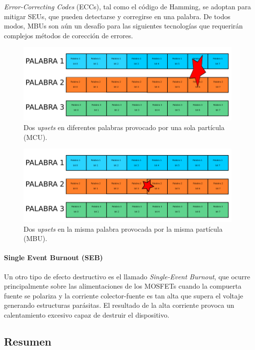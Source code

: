 \documentclass[a4paper,openright,12pt]{report}
\begin{document}
\textit{Error-Correcting Codes}  (ECCs), tal como el código de Hamming, se adoptan para mitigar SEUs, que pueden  detectarse y corregirse en una palabra. De todos modos, MBUs son aún un desafío para las siguientes tecnologías que requerirán complejos métodos de corección de errores. 

\begin{figure}[H]
	\centering
	\includegraphics[width=0.6 \textwidth]{img/MCU.pdf}
	\caption{Dos \textit{upsets} en diferentes palabras provocado por una sola partícula (MCU).}
	\label{MCU}
\end{figure}

\begin{figure}[H]
	\centering
	\includegraphics[width=0.6 \textwidth]{img/MBU.pdf}
	\caption{Dos \textit{upsets} en la misma palabra provocada por la misma partícula (MBU).}
	\label{MBU}
\end{figure}

\paragraph{Single Event Burnout (SEB)   } \hfill \break
Un otro tipo de efecto destructivo es el llamado \textit{Single-Event Burnout}, que ocurre principalmente sobre las alimentaciones de los MOSFETs cuando la compuerta fuente se polariza y la corriente colector-fuente es tan alta que supera el voltaje generando estructuras parásitas. El resultado de la alta corriente provoca un calentamiento excesivo capaz de destruir el dispositivo.

\subsection{Resumen}

\end{document}
